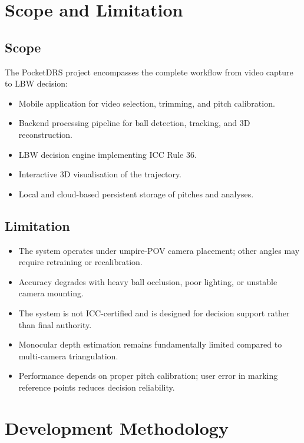 \documentclass[12pt,a4paper]{report}
\begin{document}
\section{Scope and Limitation}

\subsection{Scope}

The PocketDRS project encompasses the complete workflow from video capture to LBW decision:
\begin{itemize}
    \item Mobile application for video selection, trimming, and pitch calibration.
    \item Backend processing pipeline for ball detection, tracking, and 3D reconstruction.
    \item LBW decision engine implementing ICC Rule 36.
    \item Interactive 3D visualisation of the trajectory.
    \item Local and cloud-based persistent storage of pitches and analyses.
\end{itemize}

\subsection{Limitation}

\begin{itemize}
    \item The system operates under umpire-POV camera placement; other angles may require retraining or recalibration.
    \item Accuracy degrades with heavy ball occlusion, poor lighting, or unstable camera mounting.
    \item The system is not ICC-certified and is designed for decision support rather than final authority.
    \item Monocular depth estimation remains fundamentally limited compared to multi-camera triangulation.
    \item Performance depends on proper pitch calibration; user error in marking reference points reduces decision reliability.
\end{itemize}

\section{Development Methodology}
\end{document}

